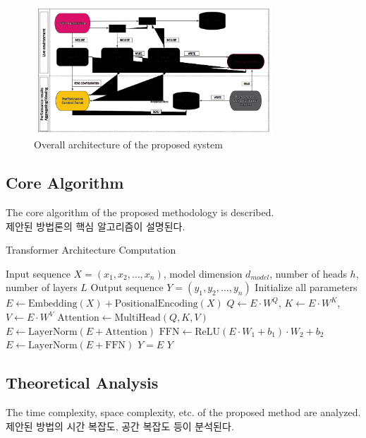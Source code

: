 \documentclass[preprint,12pt]{elsarticle}
\begin{document}
\begin{figure}[htbp]
    \centering
    \includegraphics[width=0.8\textwidth]{figures/System-overview-Atomia-Performance-Monitoring-system.png}
    \caption{Overall architecture of the proposed system}
    \label{fig:system_overview}
\end{figure}

\subsection{Core Algorithm}
The core algorithm of the proposed methodology is described. \\
제안된 방법론의 핵심 알고리즘이 설명된다. \\

\begin{algorithm}
\caption{Transformer Architecture Computation}
\label{alg:transformer}
\begin{algorithmic}[1]
\REQUIRE Input sequence $X = (x_1, x_2, \ldots, x_n)$, model dimension $d_{model}$, number of heads $h$, number of layers $L$
\ENSURE Output sequence $Y = (y_1, y_2, \ldots, y_n)$
\STATE Initialize all parameters
\STATE $E \leftarrow \text{Embedding}(X) + \text{PositionalEncoding}(X)$
    \STATE $Q \leftarrow E \cdot W^Q$, $K \leftarrow E \cdot W^K$, $V \leftarrow E \cdot W^V$
    \STATE $\text{Attention} \leftarrow \text{MultiHead}(Q, K, V)$
    \STATE $E \leftarrow \text{LayerNorm}(E + \text{Attention})$
    \STATE $\text{FFN} \leftarrow \text{ReLU}(E \cdot W_1 + b_1) \cdot W_2 + b_2$
    \STATE $E \leftarrow \text{LayerNorm}(E + \text{FFN})$
\ENDFOR
\STATE $Y = E$ 
\RETURN $Y$
\end{algorithmic}
\end{algorithm}

\subsection{Theoretical Analysis}
The time complexity, space complexity, etc. of the proposed method are analyzed. \\
제안된 방법의 시간 복잡도, 공간 복잡도 등이 분석된다. \\
\end{document}
